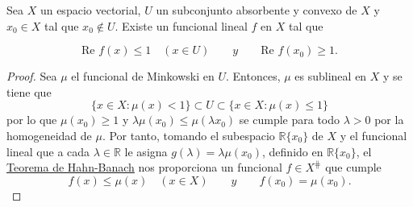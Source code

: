 \begin{corolario}
Sea $X$ un espacio vectorial, $U$ un subconjunto absorbente y convexo de $X$ y $x_{0}\in X$ tal que $x_{0}\notin U$. Existe un funcional lineal $f$ en $X$ tal que 

\begin{equation}
\text{Re } f(x)\leq 1 \quad (x\in U) \qquad y \qquad \text{Re }f(x_{0})\geq 1.
\end{equation}

\end{corolario}
\begin{proof}
Sea $\mu$ el funcional de Minkowski en $U$. Entonces, $\mu$ es sublineal en $X$ y se tiene que 
\begin{equation}
\{x\in X : \mu (x) < 1\} \subset U \subset \{x\in X : \mu (x) \leq 1\}
\end{equation}
por lo que $\mu (x_{0}) \geq 1$ y $\lambda \mu (x_{0}) \leq \mu(\lambda x_{0})$ se cumple para todo  $\lambda > 0$ por la homogeneidad de $\mu$. Por tanto, tomando el subespacio $\mathds{R}\{x_{0}\}$ de $X$ y el funcional lineal que a cada $\lambda\in\mathds{R}$ le asigna  $g(\lambda)=\lambda\mu(x_{0})$, definido en $\mathds{R}\{x_{0}\}$, el \hyperref[thm:h03]{Teorema de Hahn-Banach} nos proporciona un funcional $f\in X^{\hash}$ que cumple
\begin{equation}
f(x) \leq \mu (x) \quad (x\in X) \qquad y \qquad f(x_{0}) = \mu (x_{0}).
\end{equation}
\end{proof}

